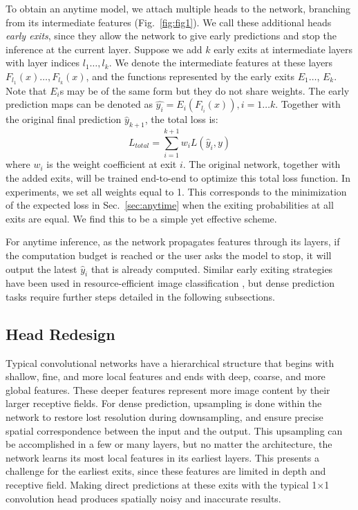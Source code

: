 To obtain an anytime model, we attach multiple heads to the network, branching from its intermediate features (Fig.~\ref{fig:fig1}).
We call these additional heads \emph{early exits}, since they allow the network to give early predictions and stop the inference at the current layer.
Suppose we add $k$ early exits at intermediate layers with layer indices $l_1 \dots, l_k$.
We denote the intermediate features at these layers $F_{l_1}(x) \dots, F_{l_k}(x)$, and the functions represented by the early exits $E_1 \dots$, $E_k$. 
Note that $E_i$s may be of the same form but they do not share weights.
The early prediction maps can be denoted as $\hat{y_i} = E_i(F_{l_i}(x)), i = 1 \dots k$.
Together with the original final prediction $\hat{y}_{k+1}$, the total loss is: 
\begin{equation}
L_{total} = \sum_{i=1}^{k+1} {w_i}L(\hat{y}_i, y)
\end{equation}
where $w_i$ is the weight coefficient at exit $i$.
The original network, together with the added exits, will be trained end-to-end to optimize this total loss function.
In experiments, we set all weights equal to 1.
This corresponds to the minimization of the expected loss in Sec.~\ref{sec:anytime} when the exiting probabilities at all exits are equal.
We find this to be a simple yet effective scheme.

For anytime inference, as the network propagates features through its layers, if the computation budget is reached or the user asks the model to stop, it will output the latest $\hat{y}_{i}$ that is already computed.
Similar early exiting strategies have been used in  resource-efficient image classification \cite{teerapittayanon2016branchynet,huang2017multi}, but dense prediction tasks require further steps detailed in the following subsections.

\subsection{Head Redesign}
\label{sec:rh}
Typical convolutional networks have a hierarchical structure that begins with shallow, fine, and more local features and ends with deep, coarse, and more global features.
These deeper features represent more image content by their larger receptive fields.
For dense prediction, upsampling is done within the network to restore lost resolution during downsampling, and ensure precise spatial correspondence between the input and the output. 
This upsampling can be accomplished in a few \cite{fcn} or many \cite{zhao2017pyramid} layers, but no matter the architecture, the network learns its most local features in its earliest layers.
This presents a challenge for the earliest exits, since these features are limited in depth and receptive field.
Making direct predictions at these exits 
with the typical 1$\times$1 convolution head
produces spatially noisy and inaccurate results.


